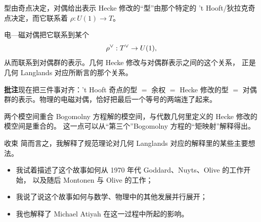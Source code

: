 \begin{frame}{型由奇点决定，对偶给出表示}
  Hecke 修改的“型”由那个特定的 't Hooft/狄拉克奇点决定，而它联系着
  $\rho:U(1)\to T$。
  \vspace{0.4em}

  电—磁对偶把它联系到某个
  \[
    \rho^{\vee}:T^{\vee}\to U(1),
  \]
  从而联系到对偶群的表示。几何 Hecke 修改与对偶群表示之间的这个关系，
  正是几何 Langlands 对应所断言的那个关系。
  \vspace{0.4em}
  \begin{beizhu}
  \textbf{批注}\quad 现在把三件事对齐：'t Hooft 奇点的型 $=$ 余权 $=$ Hecke 修改的型
  $=$ 对偶群的表示。物理的电磁对偶，恰好把最后一个等号的两端连了起来。
  \end{beizhu}
\end{frame}

\begin{frame}{两个模空间重合}
   Bogomolny 方程解的模空间，与代数几何里定义的 Hecke 修改的模空间是重合的。
  这一点可以从“第三个”Bogomolny 方程的“矩映射”解释得出。
  \vspace{0.6em}

  \begin{center}
  \end{center}
\end{frame}

\begin{frame}{收束}
   简而言之，我解释了规范理论对几何 Langlands 对应的解释里的某些主要想法。
  \begin{itemize}
    \item 我试着描述了这个故事如何从 1970 年代 Goddard、Nuyts、Olive 的工作开始，
      以及随后 Montonen 与 Olive 的工作；
    \item 我说了说这个故事如何与数学、物理中的其他发展并行展开；
    \item 我也解释了 Michael Atiyah 在这一过程中所起的影响。
  \end{itemize}
\end{frame}
